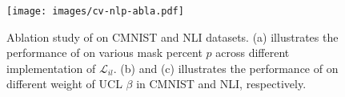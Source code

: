 \begin{figure}[ht]
    \centering
    \texttt{[image: images/cv-nlp-abla.pdf]}
    \caption{Ablation study of \ours on CMNIST and NLI datasets. (a) illustrates the performance of \ours on various mask percent $p$ across different implementation of $\mathcal{L}_{il}$. (b) and (c) illustrates the performance of \ours on different weight of UCL $\beta$ in CMNIST and NLI, respectively.}
    \label{fig:cv-nlp-abla}
    \vspace{-10pt}
\end{figure}






% 






